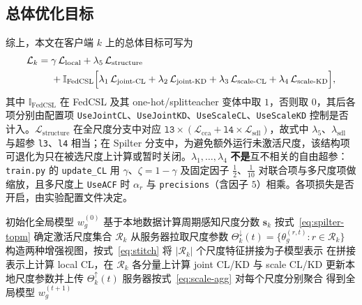 \documentclass{article}
\begin{document}
\subsection{总体优化目标}

综上，本文在客户端 $k$ 上的总体目标可写为
\begin{equation}
\begin{aligned}
\mathcal{L}_k ={}& \gamma\,\mathcal{L}_{\text{local}}
+ \lambda_5\,\mathcal{L}_{\text{structure}} \\
&+ \mathbb{I}_{\text{FedCSL}}\Bigl[
\lambda_1\,\mathcal{L}_{\text{joint-CL}}
+ \lambda_2\,\mathcal{L}_{\text{joint-KD}}
+ \lambda_3\,\mathcal{L}_{\text{scale-CL}}
+ \lambda_4\,\mathcal{L}_{\text{scale-KD}}
\Bigr],
\end{aligned}
\end{equation}
其中 $\mathbb{I}_{\text{FedCSL}}$ 在 FedCSL 及其 one-hot/splitteacher 变体中取 $1$，否则取 $0$，其后各项分别由配置项 \texttt{UseJointCL}、\texttt{UseJointKD}、\texttt{UseScaleCL}、\texttt{UseScaleKD} 控制是否计入。$\mathcal{L}_{\text{structure}}$ 在全尺度分支中对应 $\texttt{l3}\times(\mathcal{L}_{\text{cca}}+\texttt{l4}\times\mathcal{L}_{\text{sdl}})$，故式中 $\lambda_5$、$\lambda_{\text{sdl}}$ 与超参 \texttt{l3}、\texttt{l4} 相当；在 Spilter 分支中，为避免额外运行未激活尺度，该结构项可退化为只在被选尺度上计算或暂时关闭。$\lambda_1,\ldots,\lambda_4$ \textbf{不是}互不相关的自由超参：\texttt{train.py} 的 \texttt{update\_CL} 用 $\gamma$、$\zeta=1-\gamma$ 及固定因子 $\frac12$、$\frac{1}{10}$ 对联合项与多尺度项做缩放，且多尺度上 \texttt{UseACF} 时 $\alpha_r$ 与 \texttt{precisions}（含因子 $5$）相乘。各项损失是否开启，由实验配置文件决定。

\begin{algorithm}[H]
\caption{FedCSL-Spilter 训练流程}
\label{alg:fedcsl}
\begin{algorithmic}[1]
\State 初始化全局模型 $w_g^{(0)}$
    \State 基于本地数据计算周期感知尺度分数 $\mathbf{s}_k$
    \State 按式~\eqref{eq:spilter-topm} 确定激活尺度集合 $\mathcal{R}_k$
\EndFor
{}
        \State 从服务器拉取尺度参数 $\Theta_k^\downarrow(t)=\{\theta_g^{(r,t)}:r\in\mathcal{R}_k\}$
        \State 构造两种增强视图，按式~\eqref{eq:stitch} 将 $|\mathcal{R}_k|$ 个尺度特征拼接为子模型表示
        \State 在拼接表示上计算 local CL，在 $\mathcal{R}_k$ 各分量上计算 joint CL/KD 与 scale CL/KD
        \State 更新本地尺度参数并上传 $\Theta_k^\uparrow(t)$
    \EndFor
    \State 服务器按式~\eqref{eq:scale-agg} 对每个尺度分别聚合
    \State 得到全局模型 $w_g^{(t+1)}$
\EndFor
\end{algorithmic}
\end{algorithm}
\end{document}
